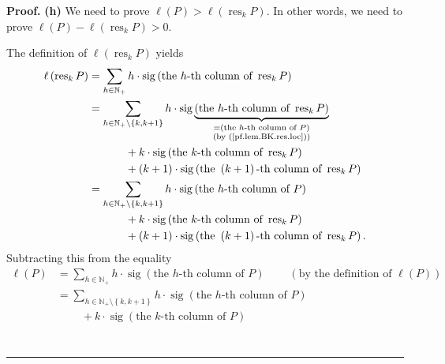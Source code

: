 \documentclass[numbers=enddot,12pt,final,onecolumn,notitlepage]{scrartcl}%
\theoremstyle{definition}
\newenvironment{proof}[1][Proof]{\noindent\textbf{#1.} }{\ \rule{0.5em}{0.5em}}
\let\sumnonlimits\sum
\renewcommand{\sum}{\sumnonlimits\limits}
\begin{document}
\begin{proof}
\textbf{(h)} We need to prove $\ell\left(  P\right)  >\ell\left(
\operatorname*{res}\nolimits_{k}P\right)  $. In other words, we need to prove
$\ell\left(  P\right)  -\ell\left(  \operatorname*{res}\nolimits_{k}P\right)
>0$.

The definition of $\ell\left(  \operatorname*{res}\nolimits_{k}P\right)  $
yields%
\begin{align*}
\ell\left(  \operatorname*{res}\nolimits_{k}P\right)   &  =\sum_{h\in
\mathbb{N}_{+}}h\cdot\operatorname*{sig}\left(  \text{the }h\text{-th column
of }\operatorname*{res}\nolimits_{k}P\right) \\
&  =\sum_{h\in\mathbb{N}_{+}\setminus\left\{  k,k+1\right\}  }h\cdot
\operatorname*{sig}\underbrace{\left(  \text{the }h\text{-th column of
}\operatorname*{res}\nolimits_{k}P\right)  }_{\substack{=\left(  \text{the
}h\text{-th column of }P\right)  \\\text{(by (\ref{pf.lem.BK.res.loc}))}}}\\
&  \ \ \ \ \ \ \ \ \ \ +k\cdot\operatorname*{sig}\left(  \text{the }k\text{-th
column of }\operatorname*{res}\nolimits_{k}P\right) \\
&  \ \ \ \ \ \ \ \ \ \ +\left(  k+1\right)  \cdot\operatorname*{sig}\left(
\text{the }\left(  k+1\right)  \text{-th column of }\operatorname*{res}%
\nolimits_{k}P\right) \\
&  =\sum_{h\in\mathbb{N}_{+}\setminus\left\{  k,k+1\right\}  }h\cdot
\operatorname*{sig}\left(  \text{the }h\text{-th column of }P\right) \\
&  \ \ \ \ \ \ \ \ \ \ +k\cdot\operatorname*{sig}\left(  \text{the }k\text{-th
column of }\operatorname*{res}\nolimits_{k}P\right) \\
&  \ \ \ \ \ \ \ \ \ \ +\left(  k+1\right)  \cdot\operatorname*{sig}\left(
\text{the }\left(  k+1\right)  \text{-th column of }\operatorname*{res}%
\nolimits_{k}P\right)  .
\end{align*}
Subtracting this from the equality%
\begin{align*}
\ell\left(  P\right)   &  =\sum_{h\in\mathbb{N}_{+}}h\cdot\operatorname*{sig}%
\left(  \text{the }h\text{-th column of }P\right)  \ \ \ \ \ \ \ \ \ \ \left(
\text{by the definition of }\ell\left(  P\right)  \right) \\
&  =\sum_{h\in\mathbb{N}_{+}\setminus\left\{  k,k+1\right\}  }h\cdot
\operatorname*{sig}\left(  \text{the }h\text{-th column of }P\right) \\
&  \ \ \ \ \ \ \ \ \ \ +k\cdot\operatorname*{sig}\left(  \text{the }k\text{-th
column of }P\right) \\

\end{align*}
\end{proof}
\end{document}
